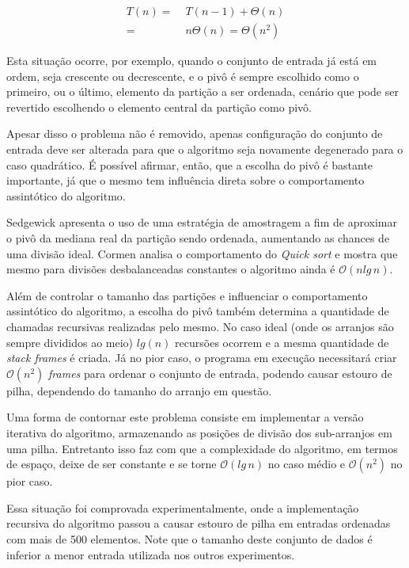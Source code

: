 \documentclass[12pt]{article}
\begin{document}
\begin{equation}
    \begin{aligned}
        T(n) = &\; T(n-1) + \Theta(n) \\
             = &\; n\Theta(n) = \Theta(n^2)
    \end{aligned}
    \label{eq:quick_worst_case}
\end{equation}

Esta situação ocorre, por exemplo, quando o conjunto de entrada já está em ordem, seja crescente ou decrescente, e o pivô é sempre escolhido como o primeiro, ou o último, elemento da partição a ser ordenada, cenário que pode ser revertido escolhendo o elemento central da partição como pivô.

Apesar disso o problema não é removido, apenas configuração do conjunto de entrada deve ser alterada para que o algoritmo seja novamente degenerado para o caso quadrático. É possível afirmar, então, que a escolha do pivô é bastante importante, já que o mesmo tem influência direta sobre o comportamento assintótico do algoritmo.

Sedgewick \cite{algorithms_redbook} apresenta o uso de uma estratégia de amostragem a fim de aproximar o pivô da mediana real da partição sendo ordenada, aumentando as chances de uma divisão ideal. Cormen \cite{cormen_algorithms_ptbr} analisa o comportamento do \textit{Quick sort} e mostra que mesmo para divisões desbalanceadas constantes o algoritmo ainda é $\mathcal{O}(nlg\,n)$.

Além de controlar o tamanho das partições e influenciar o comportamento assintótico do algoritmo, a escolha do pivô também determina a quantidade de chamadas recursivas realizadas pelo mesmo. No caso ideal (onde os arranjos são sempre divididos ao meio) $lg(n)$ recursões ocorrem e a mesma quantidade de \textit{stack frames} é criada. Já no pior caso, o programa em execução necessitará criar $\mathcal{O}(n^2)$ \textit{frames} para ordenar o conjunto de entrada, podendo causar estouro de pilha, dependendo do tamanho do arranjo em questão.

Uma forma de contornar este problema consiste em implementar a versão iterativa do algoritmo, armazenando as posições de divisão dos sub-arranjos em uma pilha. Entretanto isso faz com que a complexidade do algoritmo, em termos de espaço, deixe de ser constante e se torne $\mathcal{O}(lg\,n)$ no caso médio e $\mathcal{O}(n^2)$ no pior caso.

Essa situação foi comprovada experimentalmente, onde a implementação recursiva do algoritmo passou a causar estouro de pilha em entradas ordenadas com mais de 500 elementos. Note que o tamanho deste conjunto de dados é inferior a menor entrada utilizada nos outros experimentos.
\end{document}
